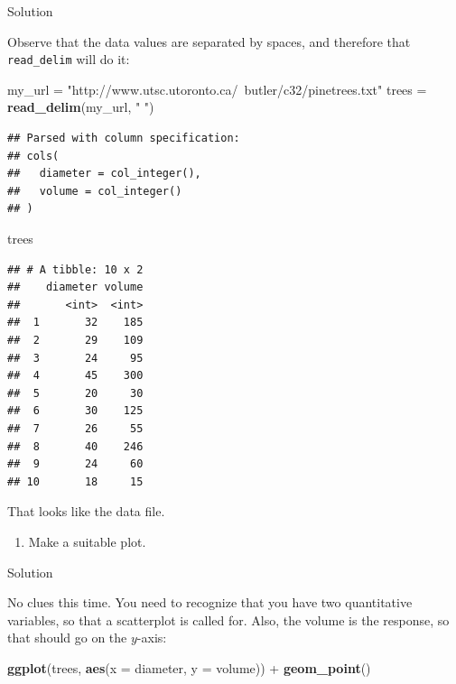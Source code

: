 \documentclass[]{tufte-book}
\newenvironment{Shaded}{}{}
\newcommand{\DataTypeTok}[1]{\textcolor[rgb]{0.56,0.13,0.00}{#1}}
\newcommand{\KeywordTok}[1]{\textcolor[rgb]{0.00,0.44,0.13}{\textbf{#1}}}
\newcommand{\NormalTok}[1]{#1}
\newcommand{\OperatorTok}[1]{\textcolor[rgb]{0.40,0.40,0.40}{#1}}
\newcommand{\StringTok}[1]{\textcolor[rgb]{0.25,0.44,0.63}{#1}}
\providecommand{\tightlist}{%
  \setlength{\itemsep}{0pt}\setlength{\parskip}{0pt}}
\theoremstyle{definition}
\theoremstyle{definition}
\theoremstyle{definition}
\theoremstyle{remark}
\begin{document}
Solution

Observe that the data values are separated by spaces, and therefore that
\texttt{read\_delim} will do it:

\begin{Shaded}
\begin{Highlighting}[]
\NormalTok{my_url =}\StringTok{ "http://www.utsc.utoronto.ca/~butler/c32/pinetrees.txt"}
\NormalTok{trees =}\StringTok{ }\KeywordTok{read_delim}\NormalTok{(my_url, }\StringTok{" "}\NormalTok{)}
\end{Highlighting}
\end{Shaded}

\begin{verbatim}
## Parsed with column specification:
## cols(
##   diameter = col_integer(),
##   volume = col_integer()
## )
\end{verbatim}

\begin{Shaded}
\begin{Highlighting}[]
\NormalTok{trees}
\end{Highlighting}
\end{Shaded}

\begin{verbatim}
## # A tibble: 10 x 2
##    diameter volume
##       <int>  <int>
##  1       32    185
##  2       29    109
##  3       24     95
##  4       45    300
##  5       20     30
##  6       30    125
##  7       26     55
##  8       40    246
##  9       24     60
## 10       18     15
\end{verbatim}

That looks like the data file.

\begin{enumerate}
\def\labelenumi{(\alph{enumi})}
\setcounter{enumi}{1}
\tightlist
\item
  Make a suitable plot.
\end{enumerate}

Solution

No clues this time. You need to recognize that you have two quantitative
variables, so that a scatterplot is called for. Also, the volume is the
response, so that should go on the \(y\)-axis:

\begin{Shaded}
\begin{Highlighting}[]
\KeywordTok{ggplot}\NormalTok{(trees, }\KeywordTok{aes}\NormalTok{(}\DataTypeTok{x =}\NormalTok{ diameter, }\DataTypeTok{y =}\NormalTok{ volume)) }\OperatorTok{+}\StringTok{ }
\StringTok{    }\KeywordTok{geom_point}\NormalTok{()}
\end{Highlighting}
\end{Shaded}
\end{document}
